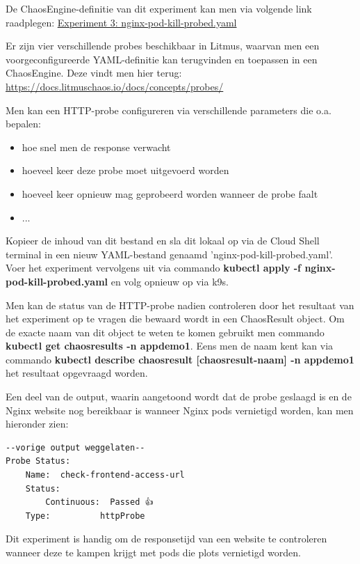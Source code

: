 De ChaosEngine-definitie van dit experiment kan men via volgende link raadplegen:  \href{https://github.com/KenBruggeman/BP\textunderscore 21-22/blob/master/bachelorproef/docs/litmus%20experimenten/nginx-pod-kill-probed.yaml}{Experiment  3: nginx-pod-kill-probed.yaml}

Er zijn vier verschillende probes beschikbaar in Litmus, waarvan men een voorgeconfigureerde YAML-definitie kan terugvinden en toepassen in een ChaosEngine. Deze vindt men hier terug: \url{https://docs.litmuschaos.io/docs/concepts/probes/} 

Men kan een HTTP-probe configureren via verschillende parameters die o.a. bepalen:
\begin{itemize}
    \item hoe snel men de response verwacht
    \item hoeveel keer deze probe moet uitgevoerd worden
    \item hoeveel keer opnieuw mag geprobeerd worden wanneer de probe faalt
    \item ...
\end{itemize}
    
Kopieer de inhoud van dit bestand en sla dit lokaal op via de Cloud Shell terminal in een nieuw YAML-bestand genaamd 'nginx-pod-kill-probed.yaml'. Voer het experiment vervolgens uit via commando {\bf kubectl apply -f nginx-pod-kill-probed.yaml} en volg opnieuw op via k9s. 

Men kan de status van de HTTP-probe nadien controleren door het resultaat van het experiment op te vragen die bewaard wordt in een ChaosResult object. Om de exacte naam van dit object te weten te komen gebruikt men commando {\bf kubectl get chaosresults -n appdemo1}. \newline Eens men de naam kent kan via commando {\bf kubectl describe chaosresult [chaosresult-naam] -n appdemo1} het resultaat opgevraagd worden.

Een deel van de output, waarin aangetoond wordt dat de probe geslaagd is en de Nginx website nog bereikbaar is wanneer Nginx pods vernietigd worden, kan men hieronder zien: 
\begin{lstlisting}
--vorige output weggelaten--    
Probe Status:
    Name:  check-frontend-access-url
    Status:
        Continuous:  Passed 👍   
    Type:          httpProbe
\end{lstlisting}

Dit experiment is handig om de responsetijd van een website te controleren wanneer deze te kampen krijgt met pods die plots vernietigd worden. 

